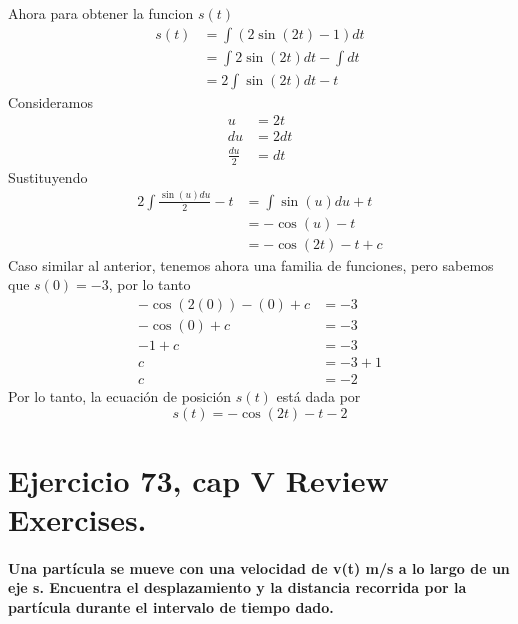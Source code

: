 \documentclass[11pt,letterpaper]{article}
\begin{document}
Ahora para obtener la funcion $s(t)$
\begin{equation*}
  \begin{split}
    s(t)&=\int (2\sin(2t)-1) dt\\
    &= \int 2\sin(2t)dt - \int dt\\
    &= 2\int\sin(2t)dt - t
  \end{split}
\end{equation*}
Consideramos
\begin{equation*}
  \begin{split}
    u &= 2t\\
    du &= 2dt\\
    \frac{du}{2} &= dt
  \end{split}
\end{equation*}
Sustituyendo
\begin{equation*}
  \begin{split}
    2\int \frac{\sin(u)du}{2}-t &= \int \sin(u)du + t\\
    &= -\cos(u)-t\\
    &= -\cos(2t)-t+c
  \end{split}
\end{equation*}
Caso similar al anterior, tenemos ahora una familia de funciones, pero sabemos que $s(0)=-3$, por lo tanto
\begin{equation*}
  \begin{split}
    -\cos(2(0))-(0)+c &= -3\\
    -\cos(0)+c &= -3\\
    -1+c &= -3 \\
    c &= -3 + 1\\
    c &= -2
  \end{split}
\end{equation*}
Por lo tanto, la ecuación de posición $s(t)$ está dada por
\begin{equation*}
  s(t)=-\cos(2t)-t-2
\end{equation*}

\section{Ejercicio 73, cap V Review Exercises.}
\paragraph*{Una partícula se mueve con una velocidad de v(t) m/s a lo largo de un eje s. Encuentra el desplazamiento y la distancia recorrida por la partícula durante el intervalo de tiempo dado.}
\end{document}
